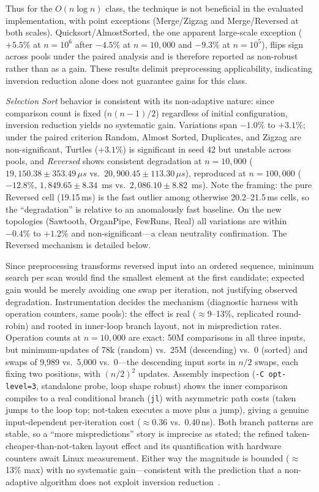 \documentclass[namedate,webpdf,contemporary,large]{TBench-template}%
\theoremstyle{thmstyleone}%
\theoremstyle{thmstyletwo}%
\theoremstyle{thmstylethree}%
\begin{document}
Thus for the $O(n\log n)$ class, the technique is not beneficial in the evaluated implementation, with point exceptions (Merge/Zigzag and Merge/Reversed at both scales). Quicksort/AlmostSorted, the one apparent large-scale exception ($+5.5\%$ at $n{=}10^6$ after $-4.5\%$ at $n{=}10{,}000$ and $-9.3\%$ at $n{=}10^5$), flips sign across pools under the paired analysis and is therefore reported as non-robust rather than as a gain. These results delimit preprocessing applicability, indicating inversion reduction alone does not guarantee gains for this class.

\emph{Selection Sort} behavior is consistent with its non-adaptive nature: since comparison count is fixed ($n(n-1)/2$) regardless of initial configuration, inversion reduction yields no systematic gain. Variations span $-1.0\%$ to $+3.1\%$; under the paired criterion Random, Almost Sorted, Duplicates, and Zigzag are non-significant, Turtles ($+3.1\%$) is significant in seed 42 but unstable across pools, and \emph{Reversed} shows consistent degradation at $n{=}10{,}000$ ($19{,}150.38\pm353.49\,\mu s$ vs.\ $20{,}900.45\pm113.30\,\mu s$), reproduced at $n=100{,}000$ ($-12.8\%$, $1{,}849.65\pm8.34$~ms vs.\ $2{,}086.10\pm8.82$~ms). Note the framing: the pure Reversed cell (19.15\,ms) is the fast outlier among otherwise 20.2--21.5\,ms cells, so the ``degradation'' is relative to an anomalously fast baseline. On the new topologies (Sawtooth, OrganPipe, FewRuns, Real) all variations are within $-0.4\%$ to $+1.2\%$ and non-significant---a clean neutrality confirmation. The Reversed mechanism is detailed below.

Since preprocessing transforms reversed input into an ordered sequence, minimum search per scan would find the smallest element at the first candidate; expected gain would be merely avoiding one swap per iteration, not justifying observed degradation. Instrumentation decides the mechanism (diagnostic harness with operation counters, same pools): the effect is real ($\approx$9--13\%, replicated round-robin) and rooted in inner-loop branch layout, not in misprediction rates. Operation counts at $n{=}10{,}000$ are exact: 50M comparisons in all three inputs, but minimum-updates of 78k (random) vs.\ 25M (descending) vs.\ 0 (sorted) and swaps of 9,989 vs.\ 5,000 vs.\ 0---the descending input sorts in $n/2$ swaps, each fixing two positions, with $(n/2)^2$ updates. Assembly inspection (\texttt{-C opt-level=3}, standalone probe, loop shape robust) shows the inner comparison compiles to a real conditional branch (\texttt{jl}) with asymmetric path costs (taken jumps to the loop top; not-taken executes a move plus a jump), giving a genuine input-dependent per-iteration cost ($\approx$0.36 vs.\ 0.40\,ns). Both branch patterns are stable, so a ``more mispredictions'' story is imprecise as stated; the refined taken-cheaper-than-not-taken layout effect and its quantification with hardware counters await Linux measurement. Either way the magnitude is bounded ($\approx$13\% max) with no systematic gain---consistent with the prediction that a non-adaptive algorithm does not exploit inversion reduction~\cite{estivill-castro_survey_1992}.
\end{document}
